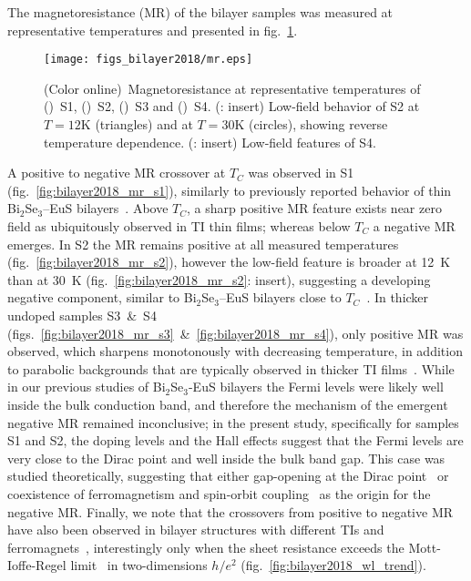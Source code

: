 The magnetoresistance (MR) of the bilayer samples was measured at representative temperatures and presented in fig.~\ref{fig:bilayer2018_mr}. %
%
\begin{figure}[ht]%
    \centering%
    \texttt{[image: figs\_bilayer2018/mr.eps]}%
    \subfloat{\label{fig:bilayer2018_mr_s1}}%
    \subfloat{\label{fig:bilayer2018_mr_s2}}%
    \subfloat{\label{fig:bilayer2018_mr_s3}}%
    \subfloat{\label{fig:bilayer2018_mr_s4}}%
    \caption[Magnetoresistance of (Bi$_{x}$Sb$_{1-x}$)$_2$Te$_3$--EuS bilayer samples]{\label{fig:bilayer2018_mr}(Color online)~Magnetoresistance at representative temperatures of (\protect{})~S1, (\protect{})~S2, (\protect{})~S3 and (\protect{})~S4. (\protect{}: insert) Low-field behavior of S2 at $T = 12\mathrm{K}$ (triangles) and at $T = 30\mathrm{K}$ (circles), showing reverse temperature dependence. (\protect{}: insert) Low-field features of S4.}%
\end{figure}%
%
A positive to negative MR crossover at $T_C$ was observed in S1 (fig.~\ref{fig:bilayer2018_mr_s1}), similarly to previously reported behavior of thin Bi$_2$Se$_3$--EuS bilayers~\cite{bilayer2014}. Above $T_C$, a sharp positive MR feature exists near zero field as ubiquitously observed in TI thin films; whereas below $T_C$ a negative MR emerges. In S2 the MR remains positive at all measured temperatures (fig.~\ref{fig:bilayer2018_mr_s2}), however the low-field feature is broader at 12~K than at 30~K (fig.~\ref{fig:bilayer2018_mr_s2}: insert), suggesting a developing negative component, similar to Bi$_2$Se$_3$--EuS bilayers close to $T_C$~\cite{bilayer2014}. In thicker undoped samples S3~\&~S4 (figs.~\ref{fig:bilayer2018_mr_s3}~\&~\ref{fig:bilayer2018_mr_s4}), only positive MR was observed, which sharpens monotonously with decreasing temperature, in addition to parabolic backgrounds that are typically observed in thicker TI films~\cite{TI_WAL_thickness}. While in our previous studies of Bi$_2$Se$_3$-EuS bilayers the Fermi levels were likely well inside the bulk conduction band, and therefore the mechanism of the emergent negative MR remained inconclusive; in the present study, specifically for samples S1 and S2, the doping levels and the Hall effects suggest that the Fermi levels are very close to the Dirac point and well inside the bulk band gap. This case was studied theoretically, suggesting that either gap-opening at the Dirac point~\cite{WL_Glazman, WL_WAL_competition} or coexistence of ferromagnetism and spin-orbit coupling~\cite{WL_ferromagnetism} as the origin for the negative MR. Finally, we note that the crossovers from positive to negative MR have also been observed in bilayer structures with different TIs and ferromagnets~\cite{Samarth2017, Tian2016}, interestingly only when the sheet resistance exceeds the Mott-Ioffe-Regel limit~\cite{Mott_book, Fradkin1986b} in two-dimensions $h/e^2$ (fig.~\ref{fig:bilayer2018_wl_trend}). %
